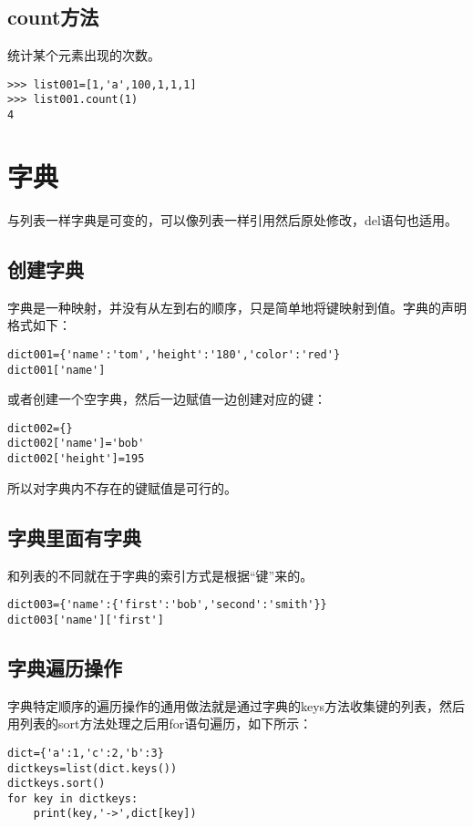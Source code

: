 \documentclass[12pt,oneside]{book}
\begin{document}
\begin{common-format}
\subsection{count方法}
统计某个元素出现的次数。
\begin{Verbatim}
>>> list001=[1,'a',100,1,1,1]
>>> list001.count(1)
4
\end{Verbatim}




\section{字典}
与列表一样字典是可变的，可以像列表一样引用然后原处修改，del语句也适用。

\subsection{创建字典}
字典是一种映射，并没有从左到右的顺序，只是简单地将键映射到值。字典的声明格式如下：
\begin{Verbatim}
dict001={'name':'tom','height':'180','color':'red'}
dict001['name']
\end{Verbatim}

或者创建一个空字典，然后一边赋值一边创建对应的键：
\begin{Verbatim}
dict002={}
dict002['name']='bob'
dict002['height']=195
\end{Verbatim}

所以对字典内不存在的键赋值是可行的。




\subsection{字典里面有字典}
和列表的不同就在于字典的索引方式是根据“键”来的。
\begin{Verbatim}
dict003={'name':{'first':'bob','second':'smith'}}
dict003['name']['first']
\end{Verbatim}

\subsection{字典遍历操作}
字典特定顺序的遍历操作的通用做法就是通过字典的keys方法收集键的列表，然后用列表的sort方法处理之后用for语句遍历，如下所示：
\begin{Verbatim}
dict={'a':1,'c':2,'b':3}
dictkeys=list(dict.keys())
dictkeys.sort()
for key in dictkeys:
    print(key,'->',dict[key])
\end{Verbatim}


\end{common-format}
\end{document}
